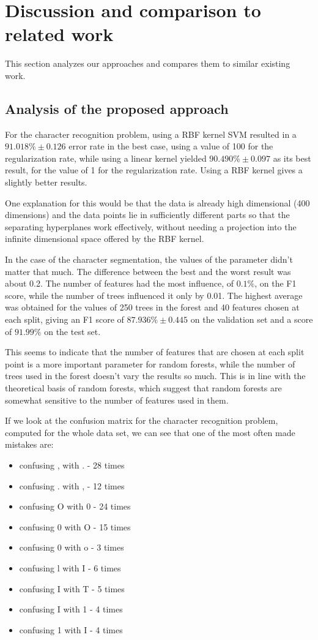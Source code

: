 \section{Discussion and comparison to related work}
\label{sec:disc}

This section analyzes our approaches and compares them to similar existing work.

\subsection{Analysis of the proposed approach}
For the character recognition problem, using a RBF kernel SVM resulted in a $ 91.018\% \pm 0.126 $ error rate in the best case, using a value of 100 for the regularization rate, while using a linear kernel yielded $ 90.490\% \pm 0.097 $ as its best result, for the value of 1 for the regularization rate. Using a RBF kernel gives a slightly better results.

One explanation for this would be that the data is already high dimensional (400 dimensions) and the data points lie in sufficiently different parts so that the separating hyperplanes work effectively, without needing a projection into the infinite dimensional space offered by the RBF kernel. 

In the case of the character segmentation, the values of the parameter didn't matter that much. The difference between the best and the worst result was about 0.2. The number of features had the most influence, of $ 0.1\% $, on the F1 score, while the number of trees influenced it only by 0.01. The highest average was obtained for the values of 250 trees in the forest and 40 features chosen at each split, giving an F1 score of $ 87.936\% \pm 0.445$ on the validation set and a score of $ 91.99\% $ on the test set.  

This seems to indicate that the number of features that are chosen at each split point is a more important parameter for random forests, while the number of trees used in the forest doesn't vary the results so much. This is in line with the theoretical basis of random forests\cite{breiman2001random}, which suggest that random forests are somewhat sensitive to the number of features used in them. 

If we look at the confusion matrix for the character recognition problem, computed for the whole data set, we can see that one of the most often made mistakes are:
\begin{itemize}
\item confusing , with . - 28 times
\item confusing . with , - 12 times
\item confusing O with 0 - 24 times
\item confusing 0 with O - 15 times
\item confusing 0 with o - 3 times
\item confusing l with I - 6 times
\item confusing I with T - 5 times
\item confusing I with 1 - 4 times
\item confusing 1 with I - 4 times
\end{itemize} 

